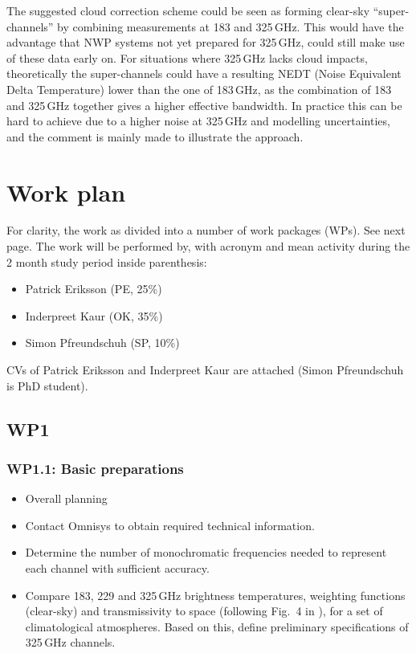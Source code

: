 \documentclass[BCOR=1cm,12pt,bibliography=totoc]{article}
\begin{document}
The suggested cloud correction scheme could be seen as forming clear-sky
``super-channels'' by combining measurements at 183 and 325\,GHz. This would
have the advantage that NWP systems not yet prepared for 325\,GHz, could still
make use of these data early on. For situations where 325\,GHz lacks cloud
impacts, theoretically the super-channels could have a resulting NEDT (Noise
Equivalent Delta Temperature) lower than the one of 183\,GHz, as the
combination of 183 and 325\,GHz together gives a higher effective bandwidth. In
practice this can be hard to achieve due to a higher noise at 325\,GHz and
modelling uncertainties, and the comment is mainly made to illustrate the
approach.


\section{Work plan}
\label{sec:wp}
%
For clarity, the work as divided into a number of work packages (WPs). See next
page. The work will be performed by, with acronym and mean activity during the
2 month study period inside parenthesis:
\begin{itemize}
\item Patrick Eriksson (PE, 25\%)
\item Inderpreet Kaur (OK, 35\%)
\item Simon Pfreundschuh (SP, 10\%)
\end{itemize}
CVs of Patrick Eriksson and Inderpreet Kaur are attached (Simon Pfreundschuh is
PhD student).

\newpage
\subsection*{WP1}
%
\subsubsection*{WP1.1: Basic preparations}
%
\begin{itemize}
\item Overall planning
\item Contact Omnisys to obtain required technical information.
\item Determine the number of monochromatic frequencies needed to represent each
  channel with sufficient accuracy. 
\item Compare 183, 229 and 325\,GHz brightness temperatures, weighting
  functions (clear-sky) and transmissivity to space (following Fig.~4 in
  \citet{eriksson:towar:20}), for a set of climatological atmospheres.
  Based on
  this, define preliminary specifications of 325\,GHz channels.
\end{itemize}
\end{document}
